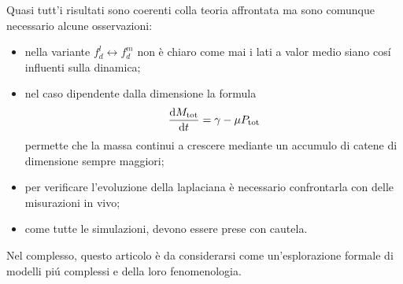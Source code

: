 \documentclass[11pt]{beamer}
\begin{document}
        \begin{frame}\frametitle{\insertpart{}}
            Quasi tutt'i risultati sono coerenti colla teoria affrontata ma sono comunque necessario alcune osservazioni:

            \begin{itemize}[%
                leftmargin=20pt,  %
                rightmargin=0pt,  %
            ] %
                \item nella variante $f_d^l\leftrightarrow f_d^m$ non è chiaro come mai i lati a valor medio siano cosí influenti sulla dinamica;
                \item nel caso dipendente dalla dimensione la formula
                      \setlength{}%
                      \setlength{}%
                      \setlength{}%
                      \setlength{}%
                      \[
                        \frac{\mathrm{d}M_{\text{tot}}}{\mathrm{d}t}=\gamma-\mu P_{\text{tot}}
                      \]
                      permette che la massa continui a crescere mediante un accumulo di catene di dimensione sempre maggiori;
                \item per verificare l'evoluzione della laplaciana è necessario confrontarla con delle misurazioni in vivo;
                \item come tutte le simulazioni, devono essere prese con cautela.
            \end{itemize}
            
            Nel complesso, questo articolo è da considerarsi come un'esplorazione formale di modelli piú complessi e della loro fenomenologia.
        \end{frame}
\end{document}
